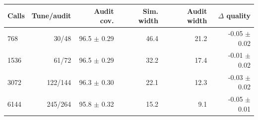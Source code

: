 \begin{tabular}{lrrrrr}
\toprule
Calls & Tune/audit & Audit cov. & Sim. width & Audit width & $\Delta$ quality \\
\midrule
768 & 30/48 & 96.5 $\pm$ 0.29 & 46.4 & 21.2 & -0.05 $\pm$ 0.02 \\
1536 & 61/72 & 96.5 $\pm$ 0.29 & 32.2 & 17.4 & -0.01 $\pm$ 0.02 \\
3072 & 122/144 & 96.3 $\pm$ 0.30 & 22.1 & 12.3 & -0.03 $\pm$ 0.02 \\
6144 & 245/264 & 95.8 $\pm$ 0.32 & 15.2 & 9.1 & -0.05 $\pm$ 0.01 \\
\bottomrule
\end{tabular}
